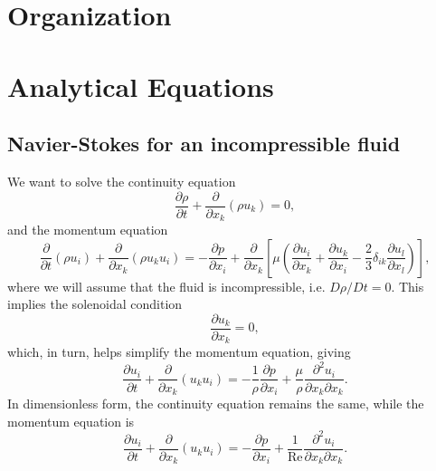 \documentclass[11pt]{article}
\newcommand{\Rey}{\text{Re}}
\begin{document}
\maketitle

\section*{Organization}


\section{Analytical Equations}

\subsection{Navier-Stokes for an incompressible fluid}

We want to solve the continuity equation
\begin{equation}
\frac{\partial \rho}{\partial t} + \frac{\partial}{\partial x_k}\left(\rho u_k\right) = 0,
\end{equation}
and the momentum equation
\begin{equation}
\frac{\partial}{\partial t}\left(\rho u_i\right) + \frac{\partial}{\partial x_k}\left(\rho u_k u_i\right) = -\frac{\partial p}{\partial x_i} + \frac{\partial}{\partial x_k}\left[\mu\left(\frac{\partial u_i}{\partial x_k} + \frac{\partial u_k}{\partial x_i}- \frac{2}{3}\delta_{ik}\frac{\partial u_l}{\partial x_l}\right)\right],
\end{equation}
where we will assume that the fluid is incompressible, i.e. $D\rho/Dt = 0$. This implies the solenoidal condition 
\begin{equation}
\frac{\partial u_k}{\partial x_k} = 0,
\end{equation}
which, in turn, helps simplify the momentum equation, giving
\begin{equation}
\frac{\partial u_i}{\partial t} + \frac{\partial}{\partial x_k}\left(u_k u_i\right) = -\frac{1}{\rho}\frac{\partial p}{\partial x_i} + \frac{\mu}{\rho}\frac{\partial^2 u_i}{\partial x_k \partial x_k}.
\end{equation}
In dimensionless form, the continuity equation remains the same, while the momentum equation is
\begin{equation}
\frac{\partial u_i}{\partial t} + \frac{\partial}{\partial x_k}\left(u_k u_i\right) = -\frac{\partial p}{\partial x_i} + \frac{1}{\Rey}\frac{\partial^2 u_i}{\partial x_k \partial x_k}.
\end{equation}
\end{document}
